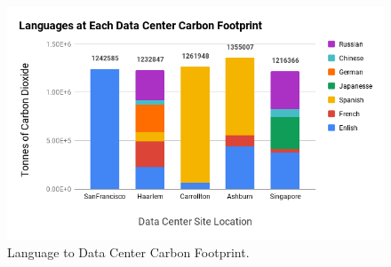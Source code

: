 \begin{figure}[h!]\centering
    \includegraphics[scale=0.5]{embodied_cost_model/images/Languages at Each Data Center Carbon Footprint.png}
    \caption[Language to Data Center Carbon Footprint]{Language to Data Center Carbon Footprint.}
    \label{fig: land_dc_carbon}
\end{figure}

